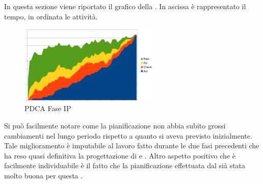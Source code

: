 	In questa sezione viene riportato il grafico  della . In ascissa è rappresentato il tempo, in ordinata le attività.
	\begin{figure}[H]
		\centering
		\includegraphics[width=0.6\textwidth]{PianoDiQualifica/Pics/GraficoPDCAFaseIP.png}
		\caption{PDCA Fase IP}
	\end{figure}

	Si può facilmente notare come la pianificazione non abbia subito grossi cambiamenti nel lungo periodo rispetto a quanto si aveva previsto inizialmente. Tale miglioramento è imputabile al lavoro fatto durante le due fasi precedenti che ha reso quasi definitiva la progettazione di  e . Altro aspetto positivo che è facilmente individuabile è il fatto che la pianificazione effettuata dal  sià stata molto buona per questa .